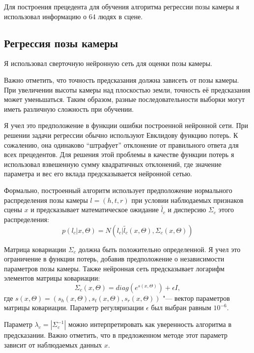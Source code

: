 Для построения прецедента для обучения алгоритма регрессии позы камеры я использовал информацию о 64 людях в сцене. 

\subsection{Регрессия позы камеры}

Я использовал сверточную нейронную сеть для оценки позы камеры.

Важно отметить, что точность предсказания должна зависеть от позы камеры. При увеличении высоты камеры над плоскостью земли, точность её предсказания может уменьшаться. Таким образом, разные последовательности выборки могут иметь различную сложность при обучении.

Я учел это предположение в функции ошибки построенной нейронной сети. При решении задачи регрессии обычно используют Евклидову функцию потерь. К сожалению, она одинаково ``штрафует'' отклонение от правильного ответа для всех прецедентов. Для решения этой проблемы в качестве функции потерь я использовал взвешенную сумму квадратичных отклонений, где значение параметра и вес его вклада предсказывается нейронной сетью.

Формально, построенный алгоритм использует предположение нормального распределения позы камеры $l=\left( h, t, r \right)$ при условии наблюдаемых признаков сцены $x$ и  предсказывает математическое ожидание $\tilde{l_c}$ и дисперсию $\Sigma_c$ этого распределения: 
\begin{equation}
p(l_{c}|x, \Theta) = N(l_c|\tilde{l_c}(x, \Theta), \Sigma_c(x, \Theta))
\end{equation}

Матрица ковариации $\Sigma_c$ должна быть положительно определенной. Я учел это ограничение в функции потерь, добавив предположение о независимости параметров позы камеры. Также нейронная сеть предсказывает логарифм элементов матрицы ковариации:
\begin{equation}
	\Sigma_c(x, \Theta) = diag\left(e^{s(x, \Theta)}\right) + \epsilon I,
\end{equation}
где $s(x, \Theta) = \left( s_h(x, \Theta), s_t(x, \Theta), s_r(x, \Theta) \right)$ "--- вектор параметров матрицы ковариации. Параметр регуляризации $\epsilon$ был выбран равным $10^{-6}$.

Параметр $\lambda_c = \left|\Sigma_c^{-1}\right|$ можно интерпретировать как уверенность алгоритма в предсказании. Важно отметить, что в предложенном методе этот параметр зависит от наблюдаемых данных $x$.

